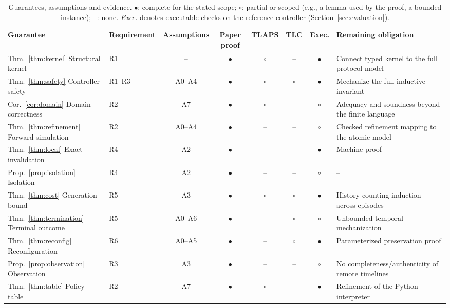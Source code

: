 \documentclass[10pt,journal,compsoc]{IEEEtran}
\theoremstyle{plain}
\theoremstyle{definition}
\begin{document}
\begin{table}[!t]
\centering
\caption{Guarantees, assumptions and evidence. $\bullet$: complete for the stated scope; $\circ$: partial or scoped (e.g., a lemma used by the proof, a bounded instance); --: none. \emph{Exec.} denotes executable checks on the reference controller (Section~\ref{sec:evaluation}).}\label{tab:evidence}
\footnotesize\setlength{\tabcolsep}{4pt}
\begin{tabular}{@{}llcccccP{58mm}@{}}\toprule
Guarantee & Requirement & Assumptions & Paper proof & TLAPS & TLC & Exec. & Remaining obligation\\\midrule
Thm.~\ref{thm:kernel} Structural kernel & R1 & -- & $\bullet$ & $\circ$ & -- & $\bullet$ & Connect typed kernel to the full protocol model\\
Thm.~\ref{thm:safety} Controller safety & R1--R3 & A0--A4 & $\bullet$ & $\circ$ & $\circ$ & $\bullet$ & Mechanize the full inductive invariant\\
Cor.~\ref{cor:domain} Domain correctness & R2 & A7 & $\bullet$ & $\circ$ & -- & $\circ$ & Adequacy and soundness beyond the finite language\\
Thm.~\ref{thm:refinement} Forward simulation & R2 & A0--A4 & $\bullet$ & -- & -- & $\circ$ & Checked refinement mapping to the atomic model\\
Thm.~\ref{thm:local} Exact invalidation & R4 & A2 & $\bullet$ & -- & -- & $\bullet$ & Machine proof\\
Prop.~\ref{prop:isolation} Isolation & R4 & A2 & $\bullet$ & -- & -- & $\circ$ & --\\
Thm.~\ref{thm:cost} Generation bound & R5 & A3 & $\bullet$ & $\circ$ & $\circ$ & $\bullet$ & History-counting induction across episodes\\
Thm.~\ref{thm:termination} Terminal outcome & R5 & A0--A6 & $\bullet$ & -- & $\circ$ & $\circ$ & Unbounded temporal mechanization\\
Thm.~\ref{thm:reconfig} Reconfiguration & R6 & A0--A5 & $\bullet$ & -- & $\circ$ & $\bullet$ & Parameterized preservation proof\\
Prop.~\ref{prop:observation} Observation & R3 & A3 & $\bullet$ & -- & -- & $\circ$ & No completeness/authenticity of remote timelines\\
Thm.~\ref{thm:table} Policy table & R2 & A7 & $\bullet$ & $\circ$ & -- & $\bullet$ & Refinement of the Python interpreter\\\bottomrule
\end{tabular}
\end{table}
\end{document}
